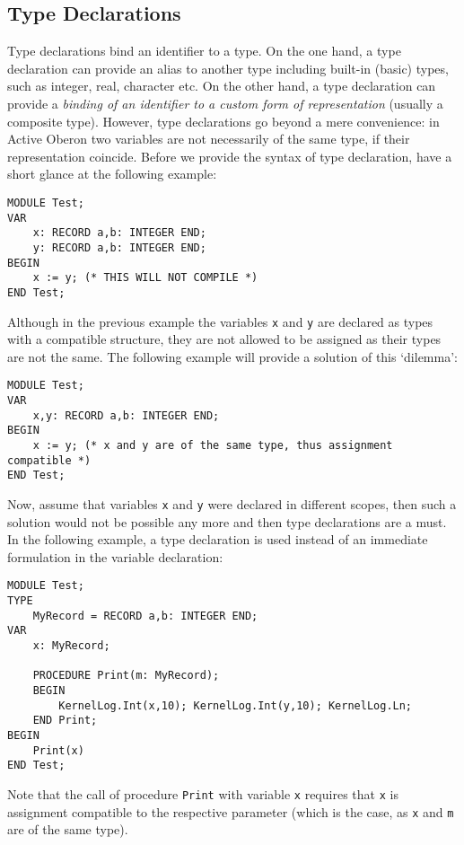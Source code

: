 \documentclass[a4paper,11pt]{article}
\begin{document}
\subsection{Type Declarations}
Type declarations bind an identifier to a type. On the one hand, a type declaration can provide an alias to another type including built-in (basic) types, such as integer, real, character etc. On the other hand, a type declaration can provide a {\em binding of an identifier to a custom form of representation} (usually a composite type). However, type declarations go beyond a mere convenience: in Active Oberon two variables are not necessarily of the same type, if their representation coincide. Before we provide the syntax of type declaration, have a short glance at the following example:
\begin{lstlisting}[language=Oberon,frame=none,caption={Incompatible types}]
MODULE Test;
VAR
    x: RECORD a,b: INTEGER END;
    y: RECORD a,b: INTEGER END;
BEGIN
    x := y; (* THIS WILL NOT COMPILE *)
END Test;
\end{lstlisting}
Although in the previous example the variables \verb+x+ and \verb+y+ are declared as types with a compatible structure, they are not allowed to be assigned as their types are not the same. The following example will provide a solution of this `dilemma':
\begin{lstlisting}[language=Oberon,frame=none,caption={Same Types}]
MODULE Test;
VAR
    x,y: RECORD a,b: INTEGER END;
BEGIN
    x := y; (* x and y are of the same type, thus assignment compatible *)
END Test;
\end{lstlisting}
Now, assume that variables \verb+x+ and \verb+y+ were declared in different scopes, then such a solution would not be possible any more and then type declarations are a must. In the following example, a type declaration is used instead of an immediate formulation in the variable declaration:
\begin{lstlisting}[language=Oberon,frame=none,caption={Using type declarations}]
MODULE Test;
TYPE
    MyRecord = RECORD a,b: INTEGER END;
VAR
    x: MyRecord;

    PROCEDURE Print(m: MyRecord);
    BEGIN
        KernelLog.Int(x,10); KernelLog.Int(y,10); KernelLog.Ln;
    END Print;
BEGIN
    Print(x)
END Test;
\end{lstlisting}
Note that the call of procedure \verb+Print+ with variable \verb+x+ requires that \verb+x+ is assignment compatible to the respective parameter (which is the case, as \verb+x+ and \verb+m+ are of the same type).
\end{document}
